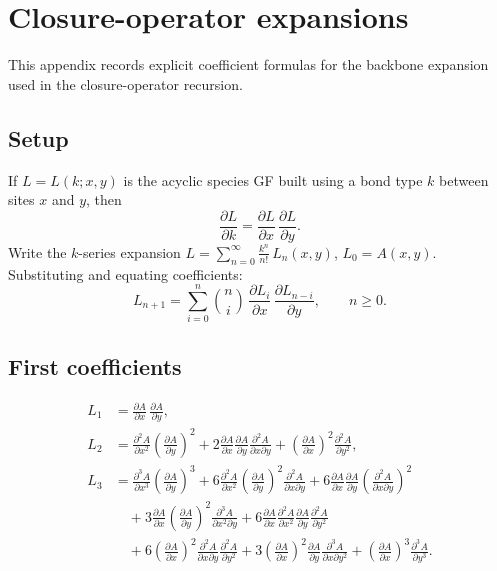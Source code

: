 \documentclass[11pt]{amsart}
\newcommand{\PDeriv}[2]{\frac{\partial #1}{\partial #2}}
\theoremstyle{definition}
\theoremstyle{plain}
\theoremstyle{remark}
\begin{document}
\appendix

\section{Closure-operator expansions}
\label{app:closure-expansions}

This appendix records explicit coefficient formulas for the backbone expansion used in the closure-operator recursion.

\subsection{Setup}
If $L=L(k;x,y)$ is the acyclic species GF built using a bond type $k$ between sites $x$ and $y$, then
\begin{equation}\label{eq:app_backbone_pde}
\PDeriv{L}{k} = \PDeriv{L}{x}\,\PDeriv{L}{y}.
\end{equation}
Write the $k$-series expansion $L = \sum_{n=0}^{\infty}\frac{k^n}{n!}\,L_n(x,y)$, $L_0 = A(x,y)$.
Substituting and equating coefficients:
\begin{equation}\label{eq:app_Ln_recursion}
L_{n+1}
=
\sum_{i=0}^{n}\binom{n}{i}\,
\frac{\partial L_i}{\partial x}\,
\frac{\partial L_{n-i}}{\partial y},
\qquad n\ge 0.
\end{equation}

\subsection{First coefficients}
\begin{align}
L_{1}
&=
\frac{\partial A}{\partial x}\,
\frac{\partial A}{\partial y},
\label{eq:app_L1}\\[0.5ex]
L_{2}
&=
\frac{\partial^2 A}{\partial x^2}\left(\frac{\partial A}{\partial y}\right)^2
+2\frac{\partial A}{\partial x}\frac{\partial A}{\partial y}\frac{\partial^2 A}{\partial x\partial y}
+\left(\frac{\partial A}{\partial x}\right)^2\frac{\partial^2 A}{\partial y^2},
\label{eq:app_L2}\\[0.5ex]
L_{3}
&=
\frac{\partial ^3A}{\partial x^3}\left(\frac{\partial A}{\partial y}\right)^3
+6\frac{\partial^2A}{\partial x^2}\left(\frac{\partial A}{\partial y}\right)^2\frac{\partial^2 A}{\partial x\partial y}
+6\frac{\partial A}{\partial x}\frac{\partial A}{\partial y}\left(\frac{\partial^2A}{\partial x\partial y}\right)^2\nonumber\\
&\quad
+3\frac{\partial A}{\partial x}\left(\frac{\partial A}{\partial y}\right)^2\frac{\partial^3A}{\partial x^2\partial y}
+6\frac{\partial A}{\partial x}\frac{\partial^2 A}{\partial x^2}\frac{\partial A}{\partial y}\frac{\partial^2A}{\partial y^2}\nonumber\\
&\quad
+6\left(\frac{\partial A}{\partial x}\right)^2\frac{\partial^2A}{\partial x\partial y}\frac{\partial^2A}{\partial y^2}
+3\left(\frac{\partial A}{\partial x}\right)^2\frac{\partial A}{\partial y}\frac{\partial^3A}{\partial x\partial y^2}
+\left(\frac{\partial A}{\partial x}\right)^3\frac{\partial^3A}{\partial y^3}.
\label{eq:app_L3}
\end{align}
\end{document}
